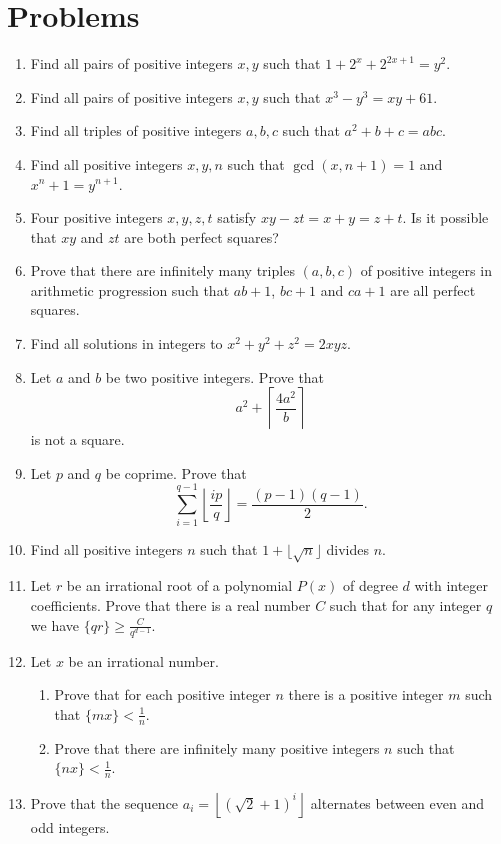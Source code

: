 \documentclass{article}
\begin{document}
\section{Problems}
\begin{enumerate}
  \item Find all pairs of positive integers $x,y$ such that
    $1+2^x+2^{2x+1}=y^2$.
  \item Find all pairs of positive integers $x,y$ such that $x^3-y^3=xy+61$.
  \item Find all triples of positive integers $a,b,c$ such that $a^2+b+c=abc$.
  \item Find all positive integers $x,y,n$ such that $\gcd(x,n+1)=1$ and
    $x^n+1=y^{n+1}$.
  \item Four positive integers $x,y,z,t$ satisfy $xy-zt=x+y=z+t$. Is it possible
    that $xy$ and $zt$ are both perfect squares?
  \item Prove that there are infinitely many triples $(a,b,c)$ of positive
    integers in arithmetic progression
    such that $ab+1$, $bc+1$ and $ca+1$ are all perfect squares.
  \item Find all solutions in integers to $x^2+y^2+z^2=2xyz$.
  \item Let $a$ and $b$ be two positive integers. Prove that
    \[a^2+\left\lceil\frac{4a^2}b\right\rceil\] is not a square.
  \item Let $p$ and $q$ be coprime. Prove that
    \[\sum_{i=1}^{q-1}\left\lfloor\frac{ip}{q}\right\rfloor=\frac{(p-1)(q-1)}2.\]
  \item Find all positive integers $n$ such that $1+\lfloor\sqrt n\rfloor$
    divides $n$.
  \item Let $r$ be an irrational root of a polynomial $P(x)$ of degree $d$ with
    integer coefficients. Prove that there is a real number $C$ such that for
    any integer $q$ we have $\{qr\}\ge \frac C{q^{d-1}}$.
  \item Let $x$ be an irrational number.
    \begin{enumerate}
      \item Prove that for each positive integer $n$ there is a positive integer
        $m$ such that $\{mx\}<\frac 1n$.
      \item Prove that there are infinitely many positive integers $n$ such
        that $\{nx\}<\frac 1n$.
    \end{enumerate}
  \item Prove that the sequence $a_i=\left\lfloor(\sqrt 2+1)^i\right\rfloor$
    alternates between even and odd integers.

\end{enumerate}
\end{document}
